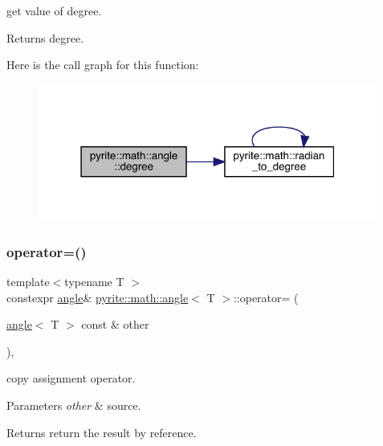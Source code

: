 get value of degree. \begin{DoxyReturn}{Returns}
degree. 
\end{DoxyReturn}
Here is the call graph for this function\+:
\nopagebreak
\begin{figure}[H]
\begin{center}
\leavevmode
\includegraphics[width=316pt]{d0/df1/classpyrite_1_1math_1_1angle_a52d68b9f0b2bedfed7fa09782dba0e82_cgraph}
\end{center}
\end{figure}
\mbox{\label{classpyrite_1_1math_1_1angle_aaa7837421f293c5d2938442efcd6cc02}} 
\subsubsection{\texorpdfstring{operator=()}{operator=()}\hspace{0.1cm}{\footnotesize\ttfamily [1/2]}}
{\footnotesize\ttfamily template$<$typename T $>$ \\
constexpr \mbox{\hyperlink{classpyrite_1_1math_1_1angle}{angle}}\& \mbox{\hyperlink{classpyrite_1_1math_1_1angle}{pyrite\+::math\+::angle}}$<$ T $>$\+::operator= (\begin{DoxyParamCaption}\item[{\mbox{\hyperlink{classpyrite_1_1math_1_1angle}{angle}}$<$ T $>$ const \&}]{other }\end{DoxyParamCaption})\hspace{0.3cm}{\ttfamily [inline]}, {\ttfamily [noexcept]}}

copy assignment operator.


\begin{DoxyParams}{Parameters}
{\em other} & source. \\
\hline
\end{DoxyParams}
\begin{DoxyReturn}{Returns}
return the result by reference. 
\end{DoxyReturn}
\mbox{\label{classpyrite_1_1math_1_1angle_acf9aa48fe206f5bdc202479bb9f0354a}} 
